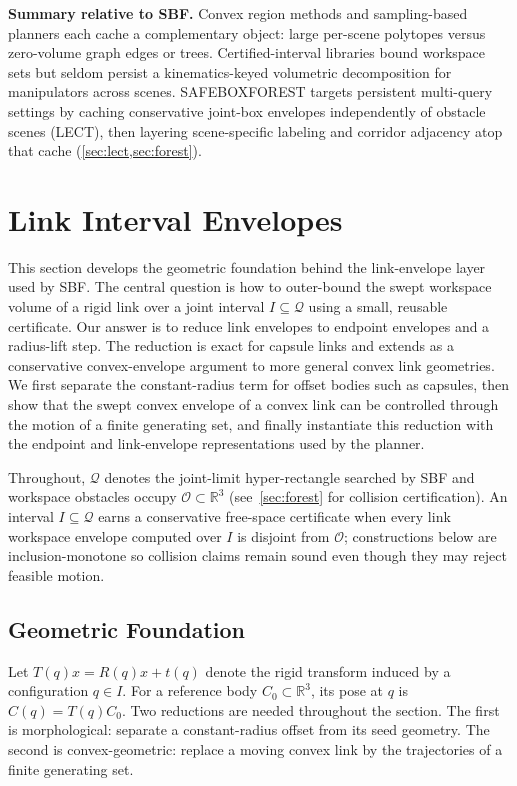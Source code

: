 \documentclass[journal]{IEEEtran}
\DeclareRobustCommand{\textsc}[1]{\textnormal{\MakeUppercase{#1}}}
\newcommand{\sbf}{\textsc{SBF}}
\newcommand{\Real}{\ensuremath{\mathbb{R}}}
\newcommand{\Q}{\ensuremath{\mathcal{Q}}}
\begin{document}
\textbf{Summary relative to \sbf.}
Convex region methods and sampling-based planners each cache a complementary object:
large per-scene polytopes versus zero-volume graph edges or trees.
Certified-interval libraries bound workspace sets but seldom persist a kinematics-keyed volumetric decomposition for manipulators across scenes.
\textsc{SafeBoxForest} targets persistent multi-query settings by caching conservative joint-box envelopes independently of obstacle scenes (LECT), then layering scene-specific labeling and corridor adjacency atop that cache (\cref{sec:lect,sec:forest}).

\section{Link Interval Envelopes}\label{sec:link_envelopes}

This section develops the geometric foundation behind the link-envelope layer
used by \sbf{}. The central question is how to outer-bound the swept workspace
volume of a rigid link over a joint interval $I \subseteq \Q$ using a small,
reusable certificate. Our answer is to reduce link envelopes to endpoint
envelopes and a radius-lift step. The reduction is exact for capsule links and
extends as a conservative convex-envelope argument to more general convex link
geometries. We first separate the constant-radius term for offset bodies such as
capsules, then show that the swept convex envelope of a convex link can be
controlled through the motion of a finite generating set, and finally
instantiate this reduction with the endpoint and link-envelope representations
used by the planner.

Throughout, $\Q$ denotes the joint-limit hyper-rectangle searched by \sbf{} and
workspace obstacles occupy $\mathcal{O}\subset\Real^3$ (see~\cref{sec:forest} for
collision certification).
An interval $I\subseteq\Q$ earns a conservative free-space certificate when every link
workspace envelope computed over $I$ is disjoint from $\mathcal{O}$; constructions
below are inclusion-monotone so collision claims remain sound even though they may
reject feasible motion.

\subsection{Geometric Foundation}\label{sec:rewrite_geom}

Let $T(q)x = R(q)x + t(q)$ denote the rigid transform induced by a
configuration $q \in I$. For a reference body $C_0 \subset \Real^3$, its pose at
$q$ is $C(q)=T(q)C_0$. Two reductions are needed throughout the section. The
first is morphological: separate a constant-radius offset from its seed
geometry. The second is convex-geometric: replace a moving convex link by the
trajectories of a finite generating set.
\end{document}
